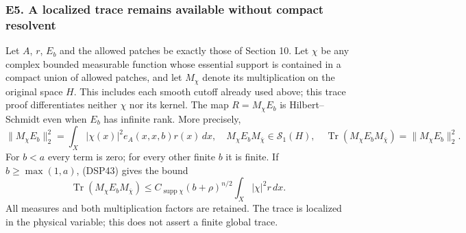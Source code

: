 \documentclass[
  11pt,
]{article}
\begin{document}
\subsubsection{E5. A localized trace remains available without compact
resolvent}\label{e5.-a-localized-trace-remains-available-without-compact-resolvent}

Let \(A\), \(r\), \(E_b\) and the allowed patches be exactly those of
Section 10. Let \(\chi\) be any complex bounded measurable function
whose essential support is contained in a compact union of allowed
patches, and let \(M_\chi\) denote its multiplication on the original
space \(H\). This includes each smooth cutoff already used above; this
trace proof differentiates neither \(\chi\) nor its kernel. The map
\(R=M_\chi E_b\) is Hilbert--Schmidt even when \(E_b\) has infinite
rank. More precisely, \[
 \|M_\chi E_b\|_2^2
 =\int_X|\chi(x)|^2 e_A(x,x,b)r(x)\,dx,
 \quad
 M_\chi E_bM_{\overline\chi}\in\mathcal S_1(H),
 \quad
 \operatorname{Tr}(M_\chi E_bM_{\overline\chi})=\|M_\chi E_b\|_2^2.
 \tag{DSP-E14}
\] For \(b<a\) every term is zero; for every other finite \(b\) it is
finite. If \(b\geq\max(1,a)\), (DSP43) gives the bound \[
 \operatorname{Tr}(M_\chi E_bM_{\overline\chi})
 \leq C_{\operatorname{supp}\chi}(b+\rho)^{n/2}
                    \int_X|\chi|^2r\,dx.
 \tag{DSP-E15}
\] All measures and both multiplication factors are retained. The trace
is localized in the physical variable; this does not assert a finite
global trace.
\end{document}
